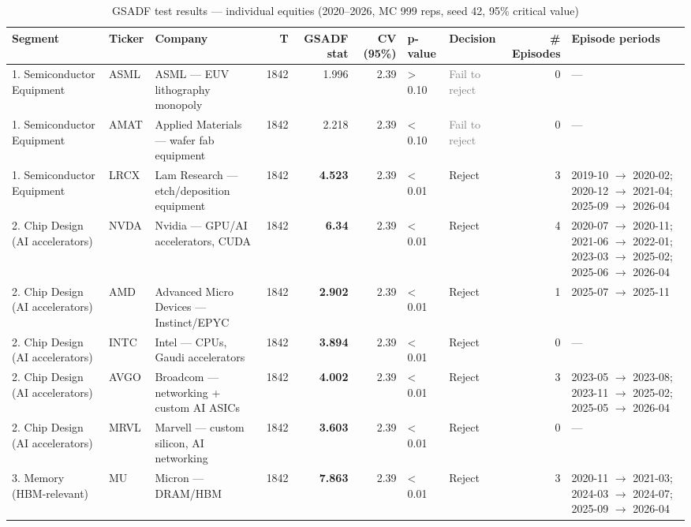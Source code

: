 \begin{table}[htbp]
\centering
\small
\caption{GSADF test results — individual equities (2020--2026, MC 999 reps, seed 42, 95\% critical value)}
\label{tab:gsadf_equity}
\begin{tabular}{llp{3.8cm}rrrllrp{4cm}}
\toprule
Segment & Ticker & Company & T & GSADF stat & CV (95\%) & p-value & Decision & \# Episodes & Episode periods \\
\midrule
1. Semiconductor Equipment & ASML & ASML --- EUV lithography monopoly & 1842 & 1.996 & 2.39 & > 0.10 & \textcolor{gray}{Fail to reject} & 0 & --- \\
1. Semiconductor Equipment & AMAT & Applied Materials --- wafer fab equipment & 1842 & 2.218 & 2.39 & < 0.10 & \textcolor{gray}{Fail to reject} & 0 & --- \\
1. Semiconductor Equipment & LRCX & Lam Research --- etch/deposition equipment & 1842 & \textbf{4.523} & 2.39 & < 0.01 & \textcolor{red!60!black}{Reject} & 3 & 2019-10 $\to$ 2020-02; 2020-12 $\to$ 2021-04; 2025-09 $\to$ 2026-04 \\
\midrule
2. Chip Design (AI accelerators) & NVDA & Nvidia --- GPU/AI accelerators, CUDA & 1842 & \textbf{6.34} & 2.39 & < 0.01 & \textcolor{red!60!black}{Reject} & 4 & 2020-07 $\to$ 2020-11; 2021-06 $\to$ 2022-01; 2023-03 $\to$ 2025-02; 2025-06 $\to$ 2026-04 \\
2. Chip Design (AI accelerators) & AMD & Advanced Micro Devices --- Instinct/EPYC & 1842 & \textbf{2.902} & 2.39 & < 0.01 & \textcolor{red!60!black}{Reject} & 1 & 2025-07 $\to$ 2025-11 \\
2. Chip Design (AI accelerators) & INTC & Intel --- CPUs, Gaudi accelerators & 1842 & \textbf{3.894} & 2.39 & < 0.01 & \textcolor{red!60!black}{Reject} & 0 & --- \\
2. Chip Design (AI accelerators) & AVGO & Broadcom --- networking + custom AI ASICs & 1842 & \textbf{4.002} & 2.39 & < 0.01 & \textcolor{red!60!black}{Reject} & 3 & 2023-05 $\to$ 2023-08; 2023-11 $\to$ 2025-02; 2025-05 $\to$ 2026-04 \\
2. Chip Design (AI accelerators) & MRVL & Marvell --- custom silicon, AI networking & 1842 & \textbf{3.603} & 2.39 & < 0.01 & \textcolor{red!60!black}{Reject} & 0 & --- \\
\midrule
3. Memory (HBM-relevant) & MU & Micron --- DRAM/HBM & 1842 & \textbf{7.863} & 2.39 & < 0.01 & \textcolor{red!60!black}{Reject} & 3 & 2020-11 $\to$ 2021-03; 2024-03 $\to$ 2024-07; 2025-09 $\to$ 2026-04 \\
\midrule

\end{tabular}
\end{table}
